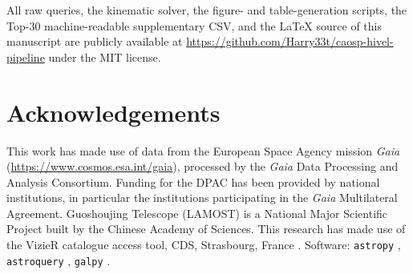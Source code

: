 \documentclass{caosp310}
\begin{document}
All raw queries, the kinematic solver, the figure- and table-generation
scripts, the Top-30 machine-readable supplementary CSV, and the LaTeX
source of this manuscript are publicly available at
\url{https://github.com/Harry33t/caosp-hivel-pipeline} under the MIT
license.

\section*{Acknowledgements}

This work has made use of data from the European Space Agency mission
\textit{Gaia} (\url{https://www.cosmos.esa.int/gaia}), processed by the
\textit{Gaia} Data Processing and Analysis Consortium. Funding for the
DPAC has been provided by national institutions, in particular the
institutions participating in the \textit{Gaia} Multilateral Agreement.
Guoshoujing Telescope (LAMOST) is a National Major Scientific Project
built by the Chinese Academy of Sciences. This research has made use of
the VizieR catalogue access tool, CDS, Strasbourg, France
\citep{Ochsenbein2000VizieR}. Software: \texttt{astropy}
\citep{Astropy2013,Astropy2018}, \texttt{astroquery}
\citep{Ginsburg2019Astroquery}, \texttt{galpy} \citep{Bovy2015galpy}.


\end{document}
